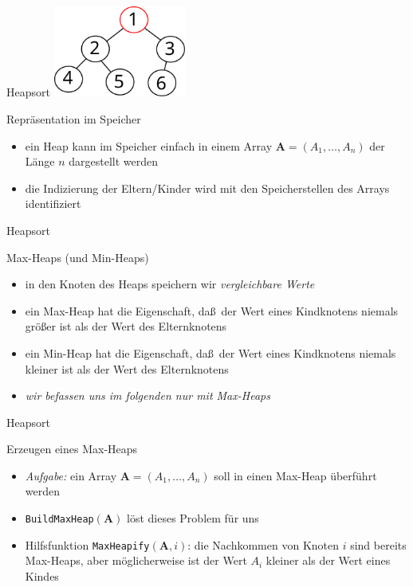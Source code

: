 \documentclass[aspectratio=1610, 11pt]{beamer}
\renewcommand{\vec}[1]{\boldsymbol{#1}}
\newcommand\vA{\vec A}
\begin{document}
\begin{frame}{Heapsort}
	\hfill\includegraphics[height=30mm]{./images/heap.pdf}
	\begin{exampleblock}{Repr\"asentation im Speicher}
		\begin{itemize}
			\item ein Heap kann im Speicher einfach in einem \alert{Array} $\vA=(A_1,\ldots,A_n)$ der L\"ange $n$ dargestellt werden
			\item die Indizierung der Eltern/Kinder wird mit den Speicherstellen des Arrays identifiziert
		\end{itemize}
	\end{exampleblock}
\end{frame}

\begin{frame}{Heapsort}
	\begin{exampleblock}{Max-Heaps (und Min-Heaps)}
		\begin{itemize}
			\item in den Knoten des Heaps speichern wir \emph{vergleichbare Werte}
			\item ein \alert{Max-Heap} hat die Eigenschaft, da\ss\ der Wert eines Kindknotens niemals gr\"o\ss er ist als der Wert des Elternknotens
			\item ein \alert{Min-Heap} hat die Eigenschaft, da\ss\ der Wert eines Kindknotens niemals kleiner ist als der Wert des Elternknotens
			\item \emph{wir befassen uns im folgenden nur mit Max-Heaps}
		\end{itemize}
	\end{exampleblock}
\end{frame}

\begin{frame}{Heapsort}
	\begin{exampleblock}{Erzeugen eines Max-Heaps}
		\begin{itemize}
			\item \emph{Aufgabe:} ein Array $\vA=(A_1,\ldots,A_n)$ soll in einen Max-Heap \"uberf\"uhrt werden
			\item {\tt BuildMaxHeap}$(\vA)$ l\"ost dieses Problem f\"ur uns
			\item Hilfsfunktion {\tt MaxHeapify}$(\vA,i)$: die Nachkommen von Knoten $i$ sind bereits Max-Heaps, aber m\"oglicherweise ist der Wert $A_i$ kleiner als der Wert eines Kindes
		\end{itemize}
	\end{exampleblock}
\end{frame}
\end{document}
